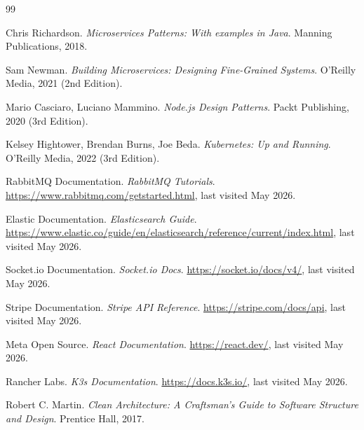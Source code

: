 \documentclass[12pt]{extreport}
\begin{document}
\begin{thebibliography}{99}

Chris Richardson.
\textit{Microservices Patterns: With examples in Java}.
Manning Publications, 2018.

Sam Newman.
\textit{Building Microservices: Designing Fine-Grained Systems}.
O'Reilly Media, 2021 (2nd Edition).

Mario Casciaro, Luciano Mammino.
\textit{Node.js Design Patterns}.
Packt Publishing, 2020 (3rd Edition).

Kelsey Hightower, Brendan Burns, Joe Beda.
\textit{Kubernetes: Up and Running}.
O'Reilly Media, 2022 (3rd Edition).

RabbitMQ Documentation.
\textit{RabbitMQ Tutorials}.
\url{https://www.rabbitmq.com/getstarted.html}, last visited May 2026.

Elastic Documentation.
\textit{Elasticsearch Guide}.
\url{https://www.elastic.co/guide/en/elasticsearch/reference/current/index.html}, last visited May 2026.

Socket.io Documentation.
\textit{Socket.io Docs}.
\url{https://socket.io/docs/v4/}, last visited May 2026.

Stripe Documentation.
\textit{Stripe API Reference}.
\url{https://stripe.com/docs/api}, last visited May 2026.

Meta Open Source.
\textit{React Documentation}.
\url{https://react.dev/}, last visited May 2026.

Rancher Labs.
\textit{K3s Documentation}.
\url{https://docs.k3s.io/}, last visited May 2026.

Robert C. Martin.
\textit{Clean Architecture: A Craftsman's Guide to Software Structure and Design}.
Prentice Hall, 2017.

\end{thebibliography}
\end{document}
